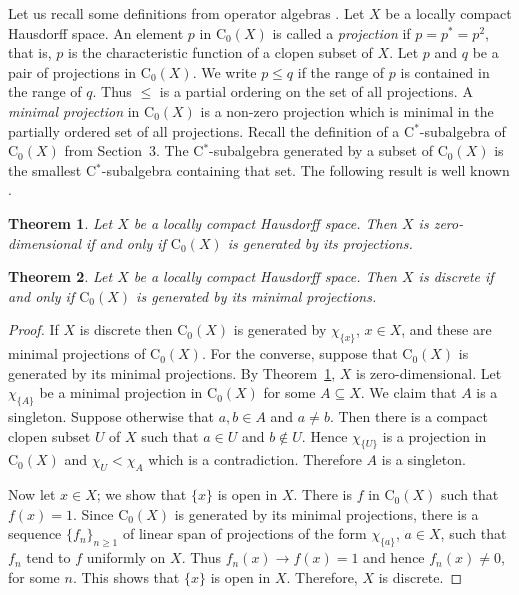 \documentclass[manuscript]{amsart}
\newtheorem{theorem}{Theorem}[section]
\theoremstyle{definition}
\begin{document}
Let us recall some definitions from operator algebras \cite{mu90, ta79}. Let
$X$ be a locally compact Hausdorff space.
An element $p$ in $\mathrm{C}_{0}(X)$ is called a \emph{projection} if
$p=p^{*}=p^{2}$, that is, $p$ is the characteristic function of a clopen subset of $X$.
Let $p$ and $q$ be a pair of projections in $\mathrm{C}_{0}(X)$.
We write $p\leq q$ if the range of $p$ is contained in the range of $q$.
Thus $\leq$ is a partial ordering on the set of all projections.
A \textit{minimal  projection} in $\mathrm{C}_{0}(X)$ is a non-zero projection
which is minimal in the partially ordered set of all projections.
Recall the definition of a C$^{*}$-subalgebra of $\mathrm{C}_{0}(X)$ from
Section~3. The C$^{*}$-subalgebra generated by a subset of
$\mathrm{C}_{0}(X)$ is the smallest C$^{*}$-subalgebra containing that set.
The following result is well known \cite{bl94}.
\begin{theorem}\label{thrzero}
Let $X$ be a locally compact Hausdorff space.  Then
$X$ is zero-dimensional if and only if
$\mathrm{C}_{0}(X)$ is generated by its projections.
\end{theorem}
\begin{theorem}\label{thrdis}
Let $X$ be a locally compact Hausdorff space. Then
$X$ is discrete if and only if $\mathrm{C}_{0}(X)$ is generated by its minimal
projections.
\end{theorem}
\begin{proof}
If $X$ is discrete then $\mathrm{C}_{0}(X)$ is generated by $\chi_{\{x\}}$, $x\in X$,
and these are minimal projections of  $\mathrm{C}_{0}(X)$. For the converse,
suppose that $\mathrm{C}_{0}(X)$ is generated by its minimal
projections. By Theorem~\ref{thrzero}, $X$ is
zero-dimensional.
 Let $\chi_{\{A\}}$ be a minimal  projection in
$\mathrm{C}_{0}(X)$ for some $A\subseteq X$. We claim that $A$ is a singleton.
Suppose otherwise that $a,b\in A$ and $a\neq b$. Then there is a compact clopen subset
$U$ of $X$ such that $a\in U$ and $b\not\in U$. Hence
$\chi_{\{U\}}$ is a  projection in $\mathrm{C}_{0}(X)$ and
$\chi_{U}<\chi_{A}$
which is a contradiction. Therefore $A$ is a singleton.

Now let $x\in X$; we show that $\{x\}$ is open in $X$.
There is  $f$ in $\mathrm{C}_{0}(X)$ such that $f(x)=1$. Since $\mathrm{C}_{0}(X)$
is generated by its minimal  projections, there is a sequence
$\{f_{n}\}_{n\geq 1}$ of linear span of projections of the form
$\chi_{\{a\}}$, $a\in X$, such that $f_{n}$ tend to $f$ uniformly on $X$.
Thus $f_{n}(x)\to f(x)=1$ and hence $f_{n}(x)\neq 0$, for some $n$.
This shows that $\{x\}$ is open in $X$. Therefore, $X$ is discrete.
\end{proof}
\end{document}
